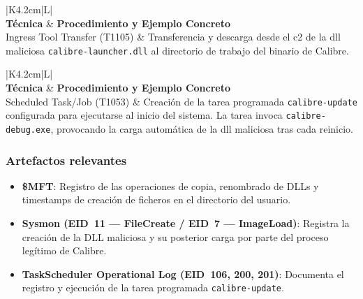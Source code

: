 \begin{table}[htbp]
    \centering
    \caption{Táctica: Execution (TA0002) — Fase de Instalación}
    \label{tab:tactica-execution-instalacion}
    \renewcommand{\arraystretch}{1.3}
    \small
    \begin{tabularx}{\textwidth}{|K{4.2cm}|L|}
        \hline
         \\ \hline
        \textbf{Técnica} & \textbf{Procedimiento y Ejemplo Concreto} \\ \hline
        Ingress Tool Transfer (T1105) & Transferencia y descarga desde el \acrshort{c2} de la \acrshort{dll} maliciosa \texttt{calibre-launcher.dll} al directorio de trabajo del binario de Calibre. \\ \hline
    \end{tabularx}
\end{table}

\begin{table}[htbp]
    \centering
    \caption{Táctica: Persistence (TA0003) — Fase de Instalación}
    \label{tab:tactica-persistence-instalacion}
    \renewcommand{\arraystretch}{1.3}
    \small
    \begin{tabularx}{\textwidth}{|K{4.2cm}|L|}
        \hline
         \\ \hline
        \textbf{Técnica} & \textbf{Procedimiento y Ejemplo Concreto} \\ \hline
        Scheduled Task/Job (T1053) & Creación de la tarea programada \texttt{calibre-update} configurada para ejecutarse al inicio del sistema. La tarea invoca \texttt{calibre-debug.exe}, provocando la carga automática de la \acrshort{dll} maliciosa tras cada reinicio. \\ \hline
    \end{tabularx}
\end{table}

\subsubsection{Artefactos relevantes}

\begin{itemize}
    \item \textbf{\$MFT}: Registro de las operaciones de copia, renombrado de DLLs y timestamps de creación de ficheros en el directorio del usuario.
    \item \textbf{Sysmon (EID~11 — FileCreate / EID~7 — ImageLoad)}: Registra la creación de la DLL maliciosa y su posterior carga por parte del proceso legítimo de Calibre.
    \item \textbf{TaskScheduler Operational Log (EID~106, 200, 201)}: Documenta el registro y ejecución de la tarea programada \texttt{calibre-update}.
\end{itemize}


